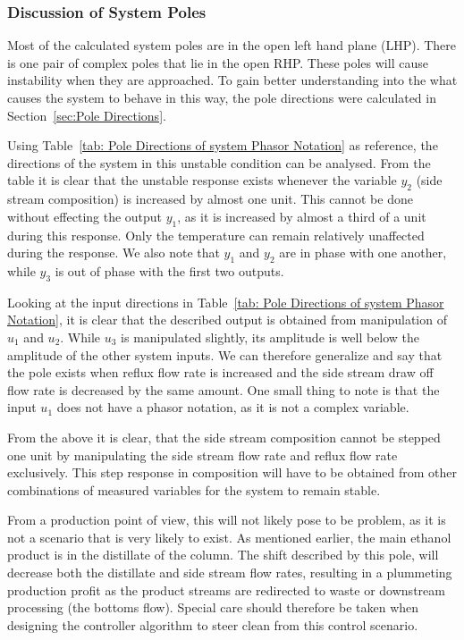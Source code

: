 \subsubsection{Discussion of System Poles}

Most of the calculated system poles are in the open left hand plane (LHP). There is one pair of complex poles that lie in the open RHP. These poles will cause instability when they are approached. To gain better understanding into the what causes the system to behave in this way, the pole directions were calculated in Section~\ref{sec:Pole Directions}. 

Using Table~\ref{tab: Pole Directions of system Phasor Notation} as reference, the directions of the system in this unstable condition can be analysed. From the table it is clear that the unstable response exists whenever the variable $y_2$ (side stream composition) is increased by almost one unit. This cannot be done without effecting the output $y_1$, as it is increased by almost a third of a unit during this response. Only the temperature can remain relatively unaffected during the response. We also note that $y_1$ and $y_2$ are in phase with one another, while $y_3$ is out of phase with the first two outputs.

Looking at the input directions in Table~\ref{tab: Pole Directions of system Phasor Notation}, it is clear that the described output is obtained from manipulation of $u_1$ and $u_2$. While $u_3$ is manipulated slightly, its amplitude is well below the amplitude of the other system inputs. We can therefore generalize and say that the pole exists when reflux flow rate is increased and the side stream draw off flow rate is decreased by the same amount. One small thing to note is that the input $u_1$ does not have a phasor notation, as it is not a complex variable.

From the above it is clear, that the side stream composition cannot be stepped one unit by manipulating the side stream flow rate and reflux flow rate exclusively. This step response in composition will have to be obtained from other combinations of measured variables for the system to remain stable.

From a production point of view, this will not likely pose to be problem, as it is not a scenario that is very likely to exist. As mentioned earlier, the main ethanol product is in the distillate of the column. The shift described by this pole, will decrease both the distillate and side stream flow rates, resulting in a plummeting production profit as the product streams are redirected to waste or downstream processing (the bottoms flow). Special care should therefore be taken when designing the controller algorithm to steer clean from this control scenario.

